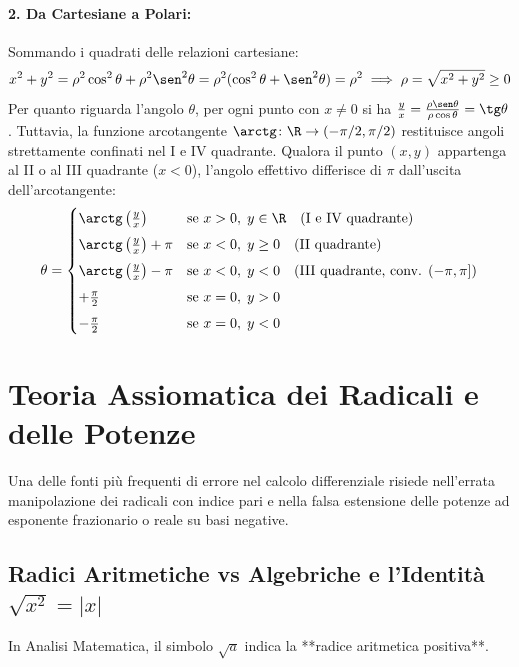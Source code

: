 \paragraph{2. Da Cartesiane a Polari:}
Sommando i quadrati delle relazioni cartesiane:
\[
    x^2 + y^2 = \rho^2 \cos^2 \theta + \rho^2 \sen^2 \theta = \rho^2 (\cos^2 \theta + \sen^2 \theta) = \rho^2 \implies \rho = \sqrt{x^2 + y^2} \ge 0
\]
Per quanto riguarda l'angolo $\theta$, per ogni punto con $x \neq 0$ si ha $\frac{y}{x} = \frac{\rho \sen \theta}{\rho \cos \theta} = \tg \theta$.
Tuttavia, la funzione arcotangente $\arctg \colon \R \to (-\pi/2, \pi/2)$ restituisce angoli strettamente confinati nel I e IV quadrante. Qualora il punto $(x, y)$ appartenga al II o al III quadrante ($x < 0$), l'angolo effettivo differisce di $\pi$ dall'uscita dell'arcotangente:
\[
    \theta = \begin{cases}
        \arctg\left(\frac{y}{x}\right) & \text{se } x > 0, \; y \in \R \quad (\text{I e IV quadrante}) \\[1ex]
        \arctg\left(\frac{y}{x}\right) + \pi & \text{se } x < 0, \; y \ge 0 \quad (\text{II quadrante}) \\[1ex]
        \arctg\left(\frac{y}{x}\right) - \pi & \text{se } x < 0, \; y < 0 \quad (\text{III quadrante, conv. } (-\pi, \pi]) \\[1ex]
        +\frac{\pi}{2} & \text{se } x = 0, \; y > 0 \\[1ex]
        -\frac{\pi}{2} & \text{se } x = 0, \; y < 0
    \end{cases}
\]

\section{Teoria Assiomatica dei Radicali e delle Potenze}
\label{sec:potenze_radicali_teoria}

Una delle fonti più frequenti di errore nel calcolo differenziale risiede nell'errata manipolazione dei radicali con indice pari e nella falsa estensione delle potenze ad esponente frazionario o reale su basi negative.

\subsection{Radici Aritmetiche vs Algebriche e l'Identità $\sqrt{x^2} = |x|$}
In Analisi Matematica, il simbolo $\sqrt{a}$ indica la **radice aritmetica positiva**.

